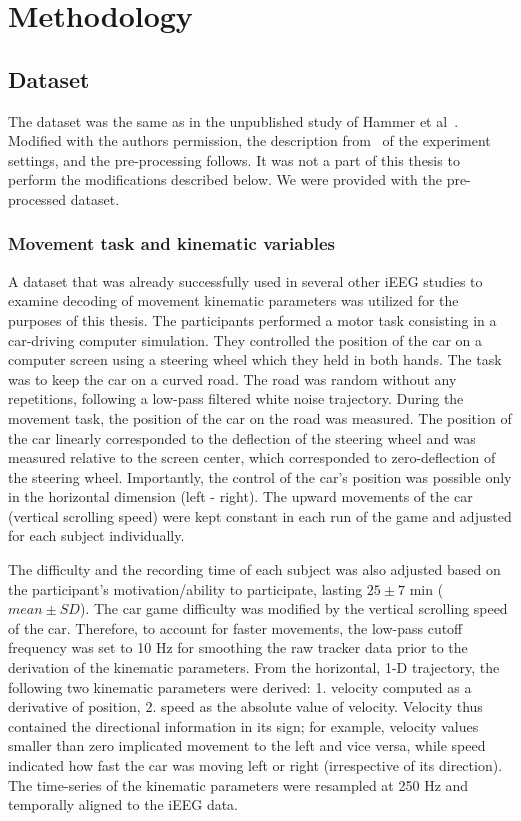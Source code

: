 \chapter{Methodology}\label{ch:methodology}


\section{Dataset}\label{sec:dataset}
The dataset was the same as in the unpublished study of Hammer et al~\cite{Hammer-2021}.
Modified with the authors permission, the description from~\cite{hammer-predominance-2016} of the experiment settings,
and the pre-processing follows.
It was not a part of this thesis to perform the modifications described below.
We were provided with the pre-processed dataset.

\subsection{Movement task and kinematic variables}\label{subsec:movement-task-and-kinematic-variables}
A dataset that was already successfully used in several other iEEG studies to examine decoding of movement kinematic parameters\cite{Hammer-2021,hammer-predominance-2016,hammer-role-2013} was utilized for the purposes of this thesis.
The participants performed a motor task consisting in a car-driving computer simulation.
They controlled the position of the car on a computer screen using a steering wheel which they held in both hands.
The task was to keep the car on a curved road.
The road was random without any repetitions, following a low-pass filtered white noise trajectory.
During the movement task, the position of the car on the road was measured.
The position of the car linearly corresponded to the deflection of the steering wheel and was measured relative to the screen center, which corresponded to zero-deflection of the steering wheel.
Importantly, the control of the car's position was possible only in the horizontal dimension (left - right).
The upward movements of the car (vertical scrolling speed) were kept constant in each run of the game and adjusted for each subject individually.

The difficulty and the recording time of each subject was also adjusted based on the participant's motivation/ability to participate, lasting $25 \pm 7$ min ($mean \pm SD$).
The car game difficulty was modified by the vertical scrolling speed of the car.
Therefore, to account for faster movements, the low-pass cutoff frequency was set to 10 Hz for smoothing the raw tracker data prior to the derivation of the kinematic parameters.
From the horizontal, 1-D trajectory, the following two kinematic parameters were derived:
1. velocity computed as a derivative of position, 2. speed as the absolute value of velocity.
Velocity thus contained the directional information in its sign;
for example, velocity values smaller than zero implicated movement to the left and vice versa, while speed indicated how fast the car was moving left or right (irrespective of its direction).
The time-series of the kinematic parameters were resampled at 250 Hz and temporally aligned to the iEEG data.

